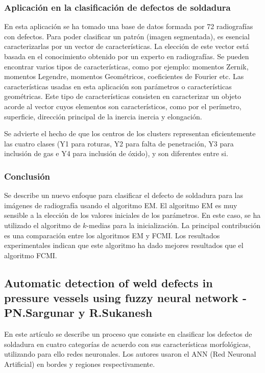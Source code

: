 \subsubsection{Aplicación en la clasificación de defectos de soldadura}
En esta aplicación se ha tomado una base de datos formada por 72 radiografías con defectos.
Para poder clasificar un patrón (imagen segmentada), es esencial caracterizarlas por un vector de características. La elección de este vector está basada en el conocimiento obtenido por un experto en radiografías. Se pueden encontrar varios tipos de características, como por ejemplo: momentos Zernik, momentos Legendre, momentos Geométricos, coeficientes de Fourier etc.
Las características usadas en esta aplicación son parámetros o características geométricas. Este tipo de características consisten en caracterizar un objeto acorde al vector cuyos elementos son característicos, como por el perímetro, superficie, dirección principal de la inercia inercia y elongación.

Se advierte el hecho de que los centros de los clusters representan eficientemente las cuatro clases (Y1 para roturas, Y2 para falta de penetración, Y3 para inclusión de gas e Y4 para inclusión de óxido), y son diferentes entre si. 


\subsubsection{Conclusión}
Se describe un nuevo enfoque para clasificar el defecto de soldadura para las imágenes de radiografía usando el algoritmo EM. El algoritmo EM es muy sensible a la elección de los valores iniciales de los parámetros. En este caso, se ha utilizado el algoritmo de $k$-medias para la inicialización. La principal contribución es una comparación entre los algoritmos EM y FCMI. Los resultados experimentales indican que este algoritmo ha dado mejores resultados que el algoritmo FCMI.


\subsection{Automatic detection of weld defects in pressure vessels using fuzzy neural network - PN.Sargunar y R.Sukanesh}
En este artículo \cite{sargunar2010automatic} se describe un proceso que consiste en clasificar los defectos de soldadura en cuatro categorías de acuerdo con sus características morfológicas, utilizando para ello redes neuronales. Los autores usaron el ANN (Red Neuronal Artificial) en bordes y regiones respectivamente. 

